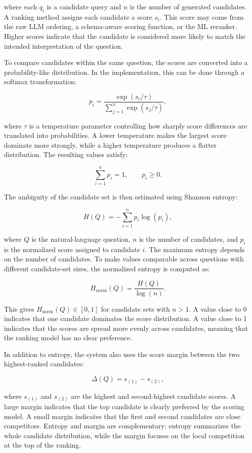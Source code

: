 \documentclass[
  12pt,
  english,
  oneside]{report}
\begin{document}
where each \(q_i\) is a candidate query and \(n\) is the number of generated candidates. A ranking method assigns each candidate a score \(s_i\). This score may come from the raw LLM ordering, a schema-aware scoring function, or the ML reranker. Higher scores indicate that the candidate is considered more likely to match the intended interpretation of the question.

To compare candidates within the same question, the scores are converted into a probability-like distribution. In the implementation, this can be done through a softmax transformation:

\[
p_i =
\frac{\exp(s_i / \tau)}
{\sum_{j=1}^{n} \exp(s_j / \tau)},
\]

where \(\tau\) is a temperature parameter controlling how sharply score differences are translated into probabilities. A lower temperature makes the largest score dominate more strongly, while a higher temperature produces a flatter distribution. The resulting values satisfy:

\[
\sum_{i=1}^{n} p_i = 1, \qquad p_i \geq 0.
\]

The ambiguity of the candidate set is then estimated using Shannon entropy:

\[
H(Q) = - \sum_{i=1}^{n} p_i \log(p_i),
\]

where \(Q\) is the natural-language question, \(n\) is the number of candidates, and \(p_i\) is the normalized score assigned to candidate \(i\). The maximum entropy depends on the number of candidates. To make values comparable across questions with different candidate-set sizes, the normalized entropy is computed as:

\[
H_{\mathrm{norm}}(Q) =
\frac{H(Q)}{\log(n)}.
\]

This gives \(H_{\mathrm{norm}}(Q) \in [0,1]\) for candidate sets with \(n > 1\). A value close to 0 indicates that one candidate dominates the score distribution. A value close to 1 indicates that the scores are spread more evenly across candidates, meaning that the ranking model has no clear preference.

In addition to entropy, the system also uses the score margin between the two highest-ranked candidates:

\[
\Delta(Q) = s_{(1)} - s_{(2)},
\]

where \(s_{(1)}\) and \(s_{(2)}\) are the highest and second-highest candidate scores. A large margin indicates that the top candidate is clearly preferred by the scoring model. A small margin indicates that the first and second candidates are close competitors. Entropy and margin are complementary: entropy summarizes the whole candidate distribution, while the margin focuses on the local competition at the top of the ranking.
\end{document}

